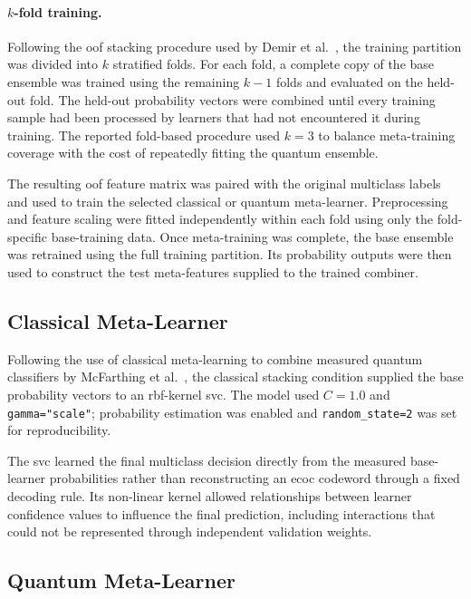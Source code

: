 \documentclass[]{UCD_CS_MSc_AAI_Report}
\begin{document}
\paragraph{$k$-fold training.} Following the \acl{oof} stacking procedure used by Demir et al.~\cite{demir_modified_2018}, the training partition was divided into $k$ stratified folds. For each fold, a complete copy of the base ensemble was trained using the remaining $k-1$ folds and evaluated on the held-out fold. The held-out probability vectors were combined until every training sample had been processed by learners that had not encountered it during training. The reported fold-based procedure used $k=3$ to balance meta-training coverage with the cost of repeatedly fitting the quantum ensemble.

The resulting \ac{oof} feature matrix was paired with the original multiclass labels and used to train the selected classical or quantum meta-learner. Preprocessing and feature scaling were fitted independently within each fold using only the fold-specific base-training data. Once meta-training was complete, the base ensemble was retrained using the full training partition. Its probability outputs were then used to construct the test meta-features supplied to the trained combiner.

\subsection{Classical Meta-Learner}

Following the use of classical meta-learning to combine measured quantum classifiers by McFarthing et al.~\cite{mcfarthing_classical_2024}, the classical stacking condition supplied the base probability vectors to an \acs{rbf}-kernel \ac{svc}. The model used $C=1.0$ and \texttt{gamma="scale"}; probability estimation was enabled and \texttt{random\_state=2} was set for reproducibility.

The \ac{svc} learned the final multiclass decision directly from the measured base-learner probabilities rather than reconstructing an \ac{ecoc} codeword through a fixed decoding rule. Its non-linear kernel allowed relationships between learner confidence values to influence the final prediction, including interactions that could not be represented through independent validation weights.

\subsection{Quantum Meta-Learner}
\end{document}
